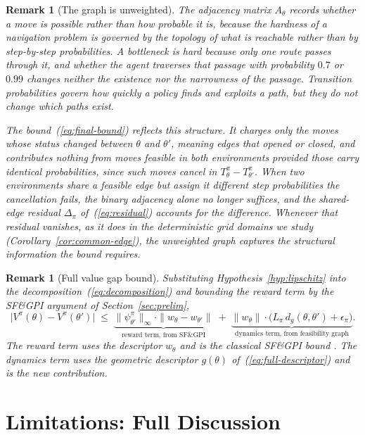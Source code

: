 \documentclass[twoside]{article}
\newtheorem{remark}[theorem]{Remark}
\begin{document}
\begin{remark}[The graph is unweighted]
\label{rem:weights}
The adjacency matrix $A_\theta$ records whether a move is possible rather than how probable it is, because the hardness of a navigation problem is governed by the topology of what is reachable rather than by step-by-step probabilities. A bottleneck is hard because only one route passes through it, and whether the agent traverses that passage with probability $0.7$ or $0.99$ changes neither the existence nor the narrowness of the passage. Transition probabilities govern how quickly a policy finds and exploits a path, but they do not change which paths exist.

The bound~(\ref{eq:final-bound}) reflects this structure. It charges only the moves whose status changed between $\theta$ and $\theta'$, meaning edges that opened or closed, and contributes nothing from moves feasible in both environments provided those carry identical probabilities, since such moves cancel in $T^\pi_\theta - T^\pi_{\theta'}$. When two environments share a feasible edge but assign it different step probabilities the cancellation fails, the binary adjacency alone no longer suffices, and the shared-edge residual $\Delta_\pi$ of~(\ref{eq:residual}) accounts for the difference. Whenever that residual vanishes, as it does in the deterministic grid domains we study (Corollary~\ref{cor:common-edge}), the unweighted graph captures the structural information the bound requires.
\end{remark}

\begin{remark}[Full value gap bound]
Substituting Hypothesis~\ref{hyp:lipschitz} into the decomposition~(\ref{eq:decomposition}) and bounding the reward term by the SF\&GPI argument of Section~\ref{sec:prelim},
\begin{equation}
    \big| V^\pi(\theta) - V^\pi(\theta') \big|
    \;\leq\;
    \underbrace{\|\psi^\pi_{\theta'}\|_\infty \cdot \|w_\theta - w_{\theta'}\|}_{\text{reward term, from SF\&GPI}}
    \;+\;
    \underbrace{\|w_\theta\| \cdot \big( L_\pi \, d_g(\theta, \theta') + \epsilon_\pi \big)}_{\text{dynamics term, from feasibility graph}}.
\end{equation}
The reward term uses the descriptor $w_\theta$ and is the classical SF\&GPI bound \citep{barreto2018transfer}. The dynamics term uses the geometric descriptor $g(\theta)$ of~(\ref{eq:full-descriptor}) and is the new contribution.
\end{remark}
\section{Limitations: Full Discussion}
\label{sec:limitations}
\end{document}
